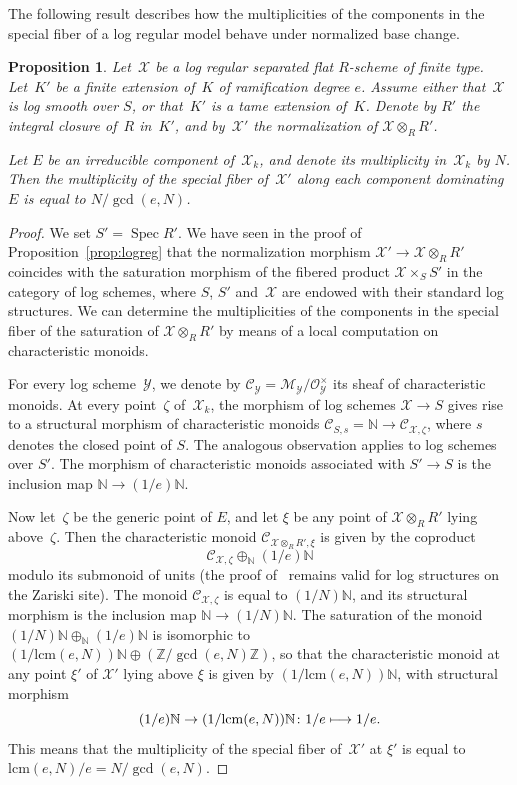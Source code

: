 \documentclass[JEP,XML,SOM,Unicode,NoFloatCountersInSection]{cedram}
\let\mathcal\mathscr
\newcommand{\mto}{\mathchoice{\longmapsto}{\mapsto}{\mapsto}{\mapsto}}
\newtheorem{prop}[equation]{Proposition}
\theoremstyle{definition}
\numberwithin{equation}{subsection}
\newcommand{\N}{\ensuremath{\mathbb{N}}}
\newcommand{\Z}{\ensuremath{\mathbb{Z}}}
\newcommand{\cX}{\ensuremath{\mathscr{X}}}
\newcommand{\cY}{\ensuremath{\mathscr{Y}}}
\newcommand{\lcm}{\mathrm{lcm}}
\DeclareMathOperator{\Spec}{Spec}
\begin{document}
The following result describes how the multiplicities of the components in the special fiber of a log regular model behave under normalized base change.
\begin{prop}\label{prop:saturated}
Let~$\cX$ be a log regular separated flat $R$\nobreakdash-scheme of finite type.
Let~$K'$ be a finite extension of~$K$ of ramification degree $e$. Assume either that~$\cX$ is log smooth over $S$, or that~$K'$ is a tame extension of~$K$.
Denote by $R'$ the integral closure of~$R$ in~$K'$, and by~$\cX'$ the normalization of $\cX\otimes_R R'$.

Let $E$ be an irreducible component of~$\cX_k$, and denote its multiplicity in~$\cX_k$ by $N$.
Then the multiplicity of the special fiber of~$\cX'$ along each component dominating $E$ is equal to $N/\gcd(e,N)$.
\end{prop}
\begin{proof}
We set $S'=\Spec R'$.
We have seen in the proof of Proposition~\ref{prop:logreg} that the normalization morphism $\cX'\to \cX\otimes_R R'$ coincides with the saturation morphism of
the fibered product $\cX\times_S S'$ in the category of log schemes, where $S$, $S'$ and~$\cX$ are endowed with their standard log structures. We can determine the multiplicities of the components in the special fiber of the saturation of $\cX\otimes_R R'$ by means of a local computation on characteristic monoids.

For every log scheme~$\cY$, we denote by $\mathcal{C}_{\cY}=\mathcal{M}_{\cY}/\mathcal{O}^{\times}_{\cY}$ its sheaf of characteristic monoids. At every point~$\zeta$ of~$\cX_k$, the morphism of log schemes
$\cX\to S$ gives rise to a structural morphism of characteristic monoids $\mathcal{C}_{S,s}=\N\to \mathcal{C}_{\cX,\zeta}$, where $s$ denotes the closed point of $S$. The analogous observation applies to log schemes over $S'$. The morphism of characteristic monoids associated with $S'\to S$ is the inclusion map $\N\to (1/e)\N$.

Now let~$\zeta$ be the generic point of $E$, and let $\xi$ be any point of $\cX\otimes_R R'$ lying above~$\zeta$.
Then the characteristic monoid
$\mathcal{C}_{\cX\otimes_R R',\xi}$ is given by the coproduct
\[
\mathcal{C}_{\cX,\zeta}\oplus_{\N}(1/e)\N
\]
modulo its submonoid of units (the proof of~\cite[2.1.1]{nakayama} remains valid for log structures on the Zariski site).
The monoid $\mathcal{C}_{\cX,\zeta}$ is equal to $(1/N)\N$, and its structural morphism is the inclusion map $\N\to (1/N)\N$. The saturation of the monoid $(1/N)\N\oplus_{\N}(1/e)\N$ is isomorphic to $(1/\lcm(e,N))\N\oplus (\Z/\gcd(e,N)\Z)$, so that the characteristic monoid at any point $\xi'$ of
$\cX'$ lying above $\xi$ is given by $(1/\lcm(e,N))\N$, with structural morphism
\[
(1/e)\N\to (1/\lcm(e,N))\N\colon 1/e\mto 1/e.
\]
This means that the multiplicity of the special fiber of~$\cX'$ at $\xi'$ is equal to $\lcm(e,N)/e=N/\gcd(e,N)$.
\end{proof}
\end{document}

